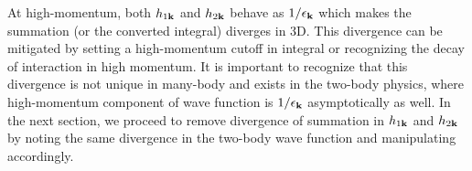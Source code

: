 At high-momentum, both $h_{1\mathbf{k}}$ and $h_{2\mathbf{k}}$ behave as $1/\epsilon_{\mathbf{k}}$ which makes the summation (or the converted integral) diverges in 3D.  This divergence can be mitigated by setting a high-momentum cutoff in integral or recognizing the decay of interaction  in high momentum.  It is important to recognize that this divergence is not unique in many-body and exists in the two-body physics, where  high-momentum component of wave function is  $1/\epsilon_{\mathbf{k}}$ asymptotically as well.  In the next section, we proceed to  remove divergence of summation in $h_{1\mathbf{k}}$ and $h_{2\mathbf{k}}$ by noting the same divergence in the two-body wave function and manipulating accordingly. 
 
